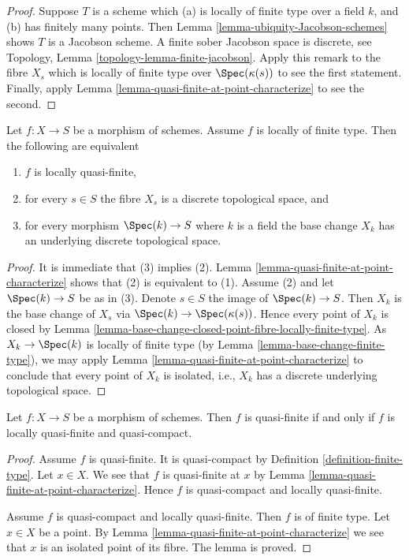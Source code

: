 \begin{proof}
Suppose $T$ is a scheme which (a) is locally of finite type
over a field $k$, and (b) has finitely many points. Then
Lemma \ref{lemma-ubiquity-Jacobson-schemes} shows $T$ is a
Jacobson scheme. A finite sober Jacobson space is discrete, see
Topology, Lemma \ref{topology-lemma-finite-jacobson}.
Apply this remark to the fibre $X_s$ which is locally of finite type over
$\Spec(\kappa(s))$ to see the first statement. Finally, apply
Lemma \ref{lemma-quasi-finite-at-point-characterize} to see the second.
\end{proof}

\begin{lemma}
\label{lemma-locally-quasi-finite-fibres}
Let $f : X \to S$ be a morphism of schemes.
Assume $f$ is locally of finite type.
Then the following are equivalent
\begin{enumerate}
\item $f$ is locally quasi-finite,
\item for every $s \in S$ the fibre $X_s$ is a discrete topological space, and
\item for every morphism $\Spec(k) \to S$ where $k$ is a field
the base change $X_k$ has an underlying discrete topological space.
\end{enumerate}
\end{lemma}

\begin{proof}
It is immediate that (3) implies (2).
Lemma \ref{lemma-quasi-finite-at-point-characterize}
shows that (2) is equivalent to (1).
Assume (2) and let $\Spec(k) \to S$ be as in (3).
Denote $s \in S$ the image  of $\Spec(k) \to S$.
Then $X_k$ is the base change of $X_s$ via
$\Spec(k) \to \Spec(\kappa(s))$. Hence every
point of $X_k$ is closed by
Lemma \ref{lemma-base-change-closed-point-fibre-locally-finite-type}.
As $X_k \to \Spec(k)$ is locally of finite type (by
Lemma \ref{lemma-base-change-finite-type}),
we may apply
Lemma \ref{lemma-quasi-finite-at-point-characterize}
to conclude that every point of $X_k$ is isolated, i.e., $X_k$ has
a discrete underlying topological space.
\end{proof}

\begin{lemma}
\label{lemma-quasi-finite-locally-quasi-compact}
Let $f : X \to S$ be a morphism of schemes.
Then $f$ is quasi-finite if and only if $f$ is
locally quasi-finite and quasi-compact.
\end{lemma}

\begin{proof}
Assume $f$ is quasi-finite. It is quasi-compact by Definition
\ref{definition-finite-type}. Let $x \in X$.
We see that $f$ is quasi-finite at $x$ by
Lemma \ref{lemma-quasi-finite-at-point-characterize}.
Hence $f$ is quasi-compact and locally quasi-finite.

\medskip\noindent
Assume $f$ is quasi-compact and locally quasi-finite.
Then $f$ is of finite type. Let $x \in X$ be a point.
By Lemma \ref{lemma-quasi-finite-at-point-characterize}
we see that $x$ is an isolated point of its fibre.
The lemma is proved.
\end{proof}


